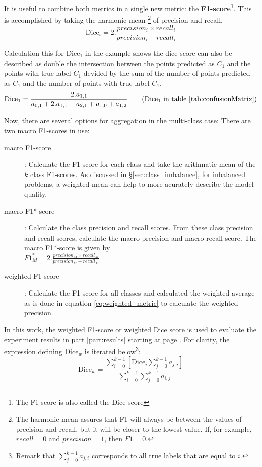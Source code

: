 \par{It is useful to combine both metrics in a single new metric: the \textbf{F1-score}\footnote{The F1-score is also called the Dice-score}. This is accomplished by taking the harmonic mean
\footnote{The harmonic mean assures that F1 will always be between the values of precision and recall, but it will be closer to the lowest value. If, for example, $recall=0$ and $precision=1$, then $F1=0$.} of precision and recall.
\begin{equation}
    \text{Dice}_i = 2 . \frac{precision_i \times recall_i }{precision_i + recall_i }
\end{equation}
}
\par{
    Calculation this for Dice$_1$ in the example shows the dice score can also be described as double the intersection 
    between the points predicted as $C_1$ and the points with true label $C_1$ devided by the sum of the number of points predicted as $C_1$ and the number of points with true label $C_1$.
    \begin{equation}
        \text{Dice}_1 = \frac{2.a_{1,1}}{a_{0,1} + 2.a_{1,1} + a_{2, 1} + a_{1,0} + a_{1,2}} \tag{Dice$_1$ in table \ref{tab:confusionMatrix}}
    \end{equation}
}
\par{
    Now, there are several options for aggregation in the multi-class case:
    There are two macro F1-scores in use:
    \begin{description}
        \item[macro F1-score]: Calculate the F1-score for each class and take the arithmatic mean of the $k$ class F1-scores. As discussed in §\ref{sec:class_imbalance}, for inbalanced problems, a weighted mean can help to more acurately describe the model quality.
        \item[macro F1*-score]: Calculate the class precision and recall scores. From these class precision and recall scores, calculate the macro precision and macro recall score. 
        The macro F1*-score is given by\\ $F1_M^*=2 . \frac{precision_M \times recall_M }{precision_M + recall_M }$
        \item[weighted F1-score]: Calculate the F1 score for all classes and calculated the weighted average as is done in equation \ref{eq:weighted_metric} to calculate the weighted precision.
    \end{description}
}
In this work, the weighted F1-score or weighted Dice score is used to evaluate the experiment results in part \ref{part:results} starting at page \pageref{part:results}.
For clarity, the expression defining $\text{Dice}_w$ is iterated below\footnote{Remark that $\sum_{j=0}^{k-1} a_{j,i}$ corresponds to all true labels that are equal to $i$.}:
\begin{equation}
    \text{Dice}_w = \frac{\sum_{i=0}^{k-1} \left[ \text{Dice}_i \sum_{j=0}^{k-1} a_{j,i} \right] }{\sum_{i=0}^{k-1} \sum_{j=0}^{k-1} a_{i,j} } \label{eq:weighted_dice}
\end{equation}

